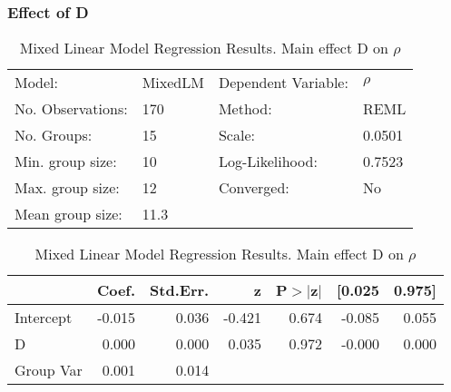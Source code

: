 \documentclass{article}
\begin{document}
\subsubsection{Effect of D}
\begin{table}
    \caption{Mixed Linear Model Regression Results. Main effect D on $\rho$}
    \label{}
    \begin{center}
    \begin{tabular}{llll}
    \hline
    Model:            & MixedLM & Dependent Variable: & $\rho$  \\
    No. Observations: & 170     & Method:             & REML     \\
    No. Groups:       & 15      & Scale:              & 0.0501   \\
    Min. group size:  & 10      & Log-Likelihood:     & 0.7523   \\
    Max. group size:  & 12      & Converged:          & No       \\
    Mean group size:  & 11.3    &                     &          \\
    \hline
    \end{tabular}
    \end{center}
    
    \begin{center}
    \begin{tabular}{lrrrrrr}
    \hline
              &  Coef. & Std.Err. &      z & P$> |$z$|$ & [0.025 & 0.975]  \\
    \hline
    Intercept & -0.015 &    0.036 & -0.421 &       0.674 & -0.085 &  0.055  \\
    D         &  0.000 &    0.000 &  0.035 &       0.972 & -0.000 &  0.000  \\
    Group Var &  0.001 &    0.014 &        &             &        &         \\
    \hline
    \end{tabular}
    \end{center}
    \end{table}
\end{document}
